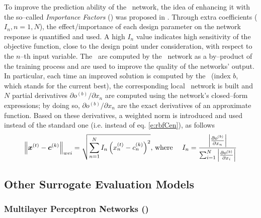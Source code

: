 \documentclass{vki_ls}
\newcommand{\vect}[1]{\bm{#1}}
\begin{document}
%
%

To improve the prediction ability of the \RBF\ network, the idea of enhancing it with the so--called \textit{Importance Factors} (\IFs) was proposed in \cite{LTT_2_018}. 
Through extra coefficients ($I_n, n\!=\!1,N$), the effect/importance of each design parameter on the network response is quantified and used.
A high $I_n$ value indicates high sensitivity of the objective function, close to the design point under consideration, with respect to the $n$--th input variable.
The \IFs\ are computed by the \RBF\ network as a by--product of the training process and are used to improve the quality of the networks' output.
In particular, each time an improved solution is computed by the \EA\ (index $b$, which stands for the current best), the corresponding local \RBF\ network is built and $N$ partial derivatives $\partial o^{(b)} / \partial x_{n}$ are computed using the network's closed--form expressions; by doing so, $\partial o^{(b)} / \partial x_{n}$ are the exact derivatives of an approximate function. 
Based on these derivatives, a weighted norm is introduced and used instead of the standard one (i.e. instead of eq. \ref{e:rbfCen}), as follows
%
\begin{equation}\label{e:IFcomp}
    \left\|\vect x^{(t)}-\vect c^{(k)}\right\|_{wei} =
    \sqrt{  \sum_{n=1}^N I_n\left(x_n^{(t)}-c_n^{(k)}\right)^2  }
	\mbox{,~where~~~~}
    I_n = { {\left|  {\partial o^{(b)}} \over {\partial x_n} \right|} 
          \over 
  { \sum_{i=1}^{N} \left| {\partial o^{(b)}} \over {\partial x_i} \right| } }
\end{equation}
%
%
\subsection[Other Surrogate Evaluation Models]
{Other Surrogate Evaluation Models}
\label{ss:otherSurrModels}

\subsubsection*{Multilayer Perceptron Networks (\MLP)}
\label{ss:mlp}
\end{document}
